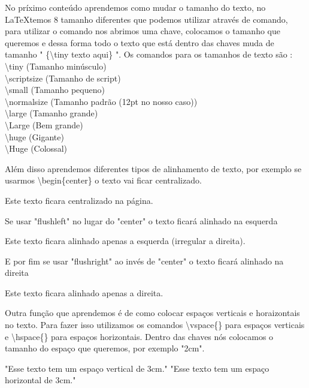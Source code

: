 No príximo conteúdo aprendemos como mudar o tamanho do texto, no \LaTeX temos 8 tamanho diferentes que podemos utilizar através de comando, para utilizar o comando nos abrimos uma chave, colocamos o tamanho que queremos e dessa forma todo o texto que está dentro das chaves muda de tamanho " \{\textbackslash tiny texto aqui\} ". Os comandos para os tamanhos de texto são :
\\
{\tiny \textbackslash tiny (Tamanho minúsculo)}
\\
{\scriptsize \textbackslash scriptsize (Tamanho de script)}
\\
{\small \textbackslash small (Tamanho pequeno)}
\\
{\normalsize \textbackslash normalsize (Tamanho padrão (12pt no nosso caso))}
\\
{\large \textbackslash large (Tamanho grande)}
\\
{\Large \textbackslash Large (Bem grande)}
\\
{\huge \textbackslash huge (Gigante)}
\\
{\Huge \textbackslash Huge (Colossal)}

Além disso aprendemos diferentes tipos de alinhamento de texto, por exemplo se usarmos \textbackslash begin\{center\} o texto vai ficar centralizado. 
\begin{center}
    Este texto ficara centralizado na página.
\end{center}

Se usar "flushleft" no lugar do "center" o texto ficará alinhado na esquerda 

\begin{flushleft}
    Este texto ficara alinhado apenas a esquerda (irregular a direita).
\end{flushleft}

E por fim se usar "flushright" ao invés de "center" o texto ficará alinhado na direita
\begin{flushright}
    Este texto ficara alinhado apenas a direita.
\end{flushright}

Outra função que aprendemos é de como colocar espaços verticais e horaizontais no texto. Para fazer isso utilizamos os comandos \textbackslash vspace\{\} para espaços verticais e \textbackslash hspace\{\} para espaços horizontais. Dentro das chaves nós colocamos o tamanho do espaço que queremos, por exemplo "2cm". 

\vspace{3cm} "Esse texto tem um espaço vertical de 3cm."
\hspace{3cm} "Esse texto tem um espaço horizontal de 3cm."

